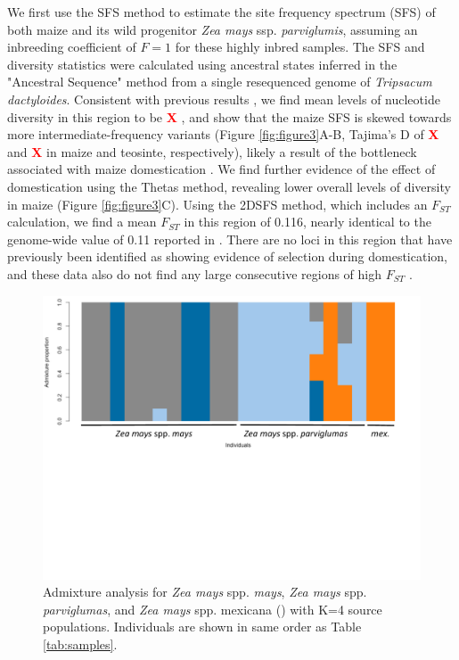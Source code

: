 \documentclass[10pt,a4paper]{article}
\newcommand{\fst}{${F_{ST}}$ }
\newcommand{\X}{\textcolor{red}{\bf X }}
\begin{document}
We first use the SFS method to estimate the site frequency spectrum (SFS) of both maize and its wild progenitor \textit{Zea mays} ssp. \textit{parviglumis}, assuming an inbreeding coefficient of $F=1$ for these highly inbred samples. 
The SFS and diversity statistics were calculated using ancestral states inferred in the "Ancestral Sequence" method from a single resequenced genome of \textit{Tripsacum dactyloides}.  
Consistent with previous results \citep{hufford2012comparative}, we find mean levels of nucleotide diversity in this region to be \X, and show that the maize SFS is skewed towards more intermediate-frequency variants (Figure \ref{fig:figure3}A-B, Tajima's D of \X and \X in maize and teosinte, respectively), likely a result of the bottleneck associated with maize domestication \citep{Beissinger031666}.
We find further evidence of the effect of domestication using the Thetas method, revealing lower overall levels of diversity in maize (Figure \ref{fig:figure3}C). 
Using the 2DSFS method, which includes an \fst calculation, we find a mean \fst in this region of 0.116, nearly identical to the  genome-wide value of 0.11 reported in \cite{hufford2012comparative}.   
There are no loci in this region that have previously been identified as showing evidence of selection during domestication, and these data also do not find any large consecutive regions of high \fst. 

\begin{figure}
\centering
\includegraphics[width=0.8\linewidth]{figures/mt4labeled.pdf}
\caption{Admixture analysis for {\it Zea mays} spp. {\it mays}, {\it Zea mays} spp. {\it parviglumas}, and {\it Zea mays} spp. {mexicana} () with K=4 source populations. Individuals are shown in same order as Table \ref{tab:samples}. }
\label{fig:admixture}
\end{figure}
\end{document}
